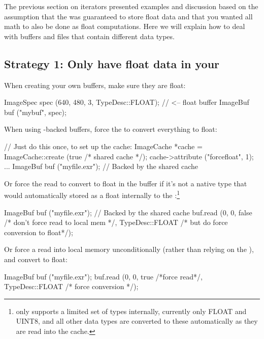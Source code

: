 The previous section on iterators presented examples and discussion
based on the assumption that the \ImageBuf was guaranteed to store {\cf
float} data and that you wanted all math to also be done as {\cf float}
computations.  Here we will explain how to deal with buffers and files
that contain different data types.

\subsection*{Strategy 1: Only have {\cf float} data in your \ImageBuf}

\noindent When creating your own buffers, make sure they are {\cf float}:

\begin{code}
    ImageSpec spec (640, 480, 3, TypeDesc::FLOAT); // <-- float buffer
    ImageBuf buf ("mybuf", spec);
\end{code}

\noindent When using \ImageCache-backed buffers, force the \ImageCache
to convert everything to {\cf float}:

\begin{code}
    // Just do this once, to set up the cache:
    ImageCache *cache = ImageCache::create (true /* shared cache */);
    cache->attribute ("forcefloat", 1);
    ...
    ImageBuf buf ("myfile.exr");   // Backed by the shared cache
\end{code}

\noindent Or force the read to convert to {\cf float} in the buffer if
it's not a native type that would automatically stored as a {\cf float}
internally to the \ImageCache:\footnote{\ImageCache only supports a
limited set of types internally, currently only FLOAT and UINT8, and all
other data types are converted to these automatically as they are read
into the cache.}

\begin{code}
    ImageBuf buf ("myfile.exr");   // Backed by the shared cache
    buf.read (0, 0, false /* don't force read to local mem */,
              TypeDesc::FLOAT /* but do force conversion to float*/);
\end{code}

\noindent Or force a read into local memory unconditionally (rather
than relying on the \ImageCache), and convert to {\cf float}:

\begin{code}
    ImageBuf buf ("myfile.exr");
    buf.read (0, 0, true /*force read*/,
              TypeDesc::FLOAT /* force conversion */);
\end{code}

